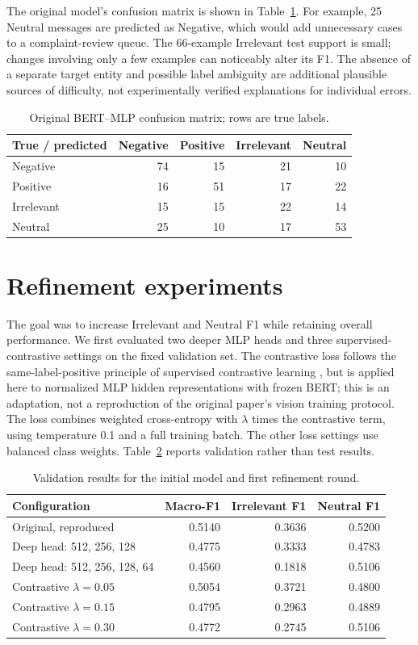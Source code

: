 The original model's confusion matrix is shown in Table~\ref{tab:cm}. For example, 25 Neutral messages are predicted as Negative, which would add unnecessary cases to a complaint-review queue. The 66-example Irrelevant test support is small; changes involving only a few examples can noticeably alter its F1. The absence of a separate target entity and possible label ambiguity are additional plausible sources of difficulty, not experimentally verified explanations for individual errors.

\begin{table}[htbp]
\centering
\caption{Original BERT--MLP confusion matrix; rows are true labels.}
\label{tab:cm}
\begin{tabular}{lrrrr}
\toprule
True / predicted & Negative & Positive & Irrelevant & Neutral \\
\midrule
Negative & 74 & 15 & 21 & 10 \\
Positive & 16 & 51 & 17 & 22 \\
Irrelevant & 15 & 15 & 22 & 14 \\
Neutral & 25 & 10 & 17 & 53 \\
\bottomrule
\end{tabular}
\end{table}

\section{Refinement experiments}
The goal was to increase Irrelevant and Neutral F1 while retaining overall performance. We first evaluated two deeper MLP heads and three supervised-contrastive settings on the fixed validation set. The contrastive loss follows the same-label-positive principle of supervised contrastive learning \cite{supcon}, but is applied here to normalized MLP hidden representations with frozen BERT; this is an adaptation, not a reproduction of the original paper's vision training protocol. The loss combines weighted cross-entropy with $\lambda$ times the contrastive term, using temperature 0.1 and a full training batch. The other loss settings use balanced class weights. Table~\ref{tab:val} reports validation rather than test results.

\begin{table}[htbp]
\centering
\caption{Validation results for the initial model and first refinement round.}
\label{tab:val}
\begin{tabular}{lrrr}
\toprule
Configuration & Macro-F1 & Irrelevant F1 & Neutral F1 \\
\midrule
Original, reproduced & 0.5140 & 0.3636 & 0.5200 \\
Deep head: 512, 256, 128 & 0.4775 & 0.3333 & 0.4783 \\
Deep head: 512, 256, 128, 64 & 0.4560 & 0.1818 & 0.5106 \\
Contrastive $\lambda=0.05$ & 0.5054 & 0.3721 & 0.4800 \\
Contrastive $\lambda=0.15$ & 0.4795 & 0.2963 & 0.4889 \\
Contrastive $\lambda=0.30$ & 0.4772 & 0.2745 & 0.5106 \\
\bottomrule
\end{tabular}
\end{table}

